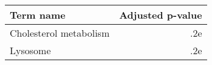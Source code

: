 \begin{tabular}{lr}
\toprule
             Term name &  Adjusted p-value \\
\midrule
Cholesterol metabolism &               .2e \\
              Lysosome &               .2e \\
\bottomrule
\end{tabular}
